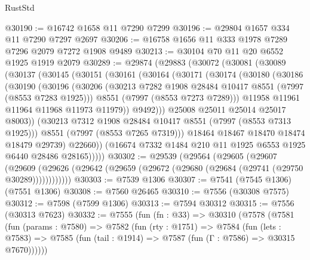 \begin{lexlean}{RustStd}
\begin{coremodule}
@30190 := @16742 @1658 @11 @7290 @7299
@30196 := @29804 @1657 @334 @11 @7290 @7297 @2697
@30206 := @16758 @1656 @11 @333 @1978 @7289 @7296 @2079 @7272 @1908 @9489
@30213 := @30104 @70 @11 @20 @6552 @1925 @1919 @2079
@30289 := @29874
    (@29883
      (@30072
        (@30081
          (@30089
            (@30137
              (@30145
                (@30151
                  (@30161
                    (@30164
                      (@30171
                        (@30174
                          (@30180
                            (@30186
                              (@30190
                                (@30196
                                  (@30206
                                    (@30213
                                      @7282
                                      @1908
                                      @28484
                                      @10417
                                      @8551
                                      (@7997 (@8553 @7283 @1925)))
                                    @8551
                                    (@7997 (@8553 @7273 @7289)))
                                  @11958
                                  @11961
                                  @11964
                                  @11968
                                  @11973
                                  @11979))
                              @9492)))
                        @25008
                        @25011
                        @25014
                        @25017
                        @8003))
                    (@30213 @7312 @1908 @28484 @10417 @8551 (@7997 (@8553 @7313 @1925)))
                    @8551
                    (@7997 (@8553 @7265 @7319)))
                  @18464
                  @18467
                  @18470
                  @18474
                  @18479
                  @29739)
                @22660))
            (@16674 @7332 @1484 @210 @11 @1925 @6553 @1925 @6440 @28486 @28165)))))
@30302 := @29539
    (@29564
      (@29605
        (@29607
          (@29609 (@29626 (@29642 (@29659 (@29672 (@29680 (@29684 (@29741 (@29750 @30289))))))))))))
@30303 := @7539 @1306
@30307 := @7541 (@7545 @1306) (@7551 @1306)
@30308 := @7560 @26465
@30310 := @7556 (@30308 @7575)
@30312 := @7598 (@7599 @1306)
@30313 := @7594 @30312
@30315 := @7556 (@30313 @7623)
@30332 := @7555
    (fun (fn : @33) =>
    @30310
      (@7578
        (@7581
          (fun (params : @7580) =>
          @7582
            (fun (rty : @1751) =>
            @7584
              (fun (lets : @7583) =>
              @7585 (fun (tail : @1914) => @7587 (fun (Γ : @7586) => @30315 @7670))))))

\end{coremodule}
\end{lexlean}
